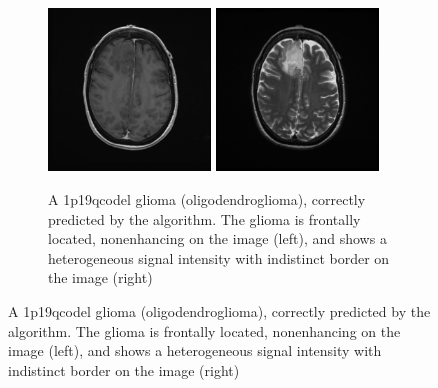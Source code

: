 \begin{figure}[htbp]
     \centering
     \begin{subfigure}[b]{0.8\textwidth}
         \centering
         \includegraphics[width=0.475\textwidth]{Figures/LGG_104_codeleted_example_T1.png}
         \includegraphics[width=0.475\textwidth]{Figures/LGG_104_codeleted_example_T2.png}
         \caption{A \acl{1p19qcodel} glioma (oligodendroglioma), correctly predicted by the algorithm. The glioma is frontally located, nonenhancing on the   image (left), and shows a heterogeneous signal intensity with indistinct border on the   image (right)}\label{fig:LGG_1p19q_example_codeleted}
     \end{subfigure}



\end{figure}

